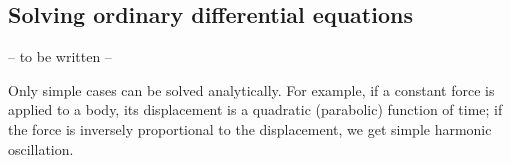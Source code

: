 \subsection{Solving ordinary differential equations}

-- to be written --

Only simple cases can be solved analytically. For example, if a constant force is applied to a
body, its displacement is a quadratic (parabolic) function of time; if the force is inversely
proportional to the displacement, we get simple harmonic oscillation.
